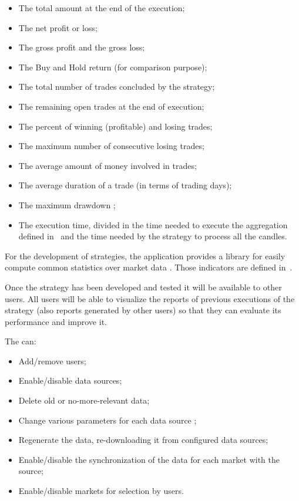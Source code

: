 \begin{itemize}
	\item The total amount at the end of the execution;
	\item The net profit or loss;
	\item The gross profit  and the gross loss;
	\item The Buy and Hold return (for comparison purpose);
	\item The total number of trades concluded by the strategy;
	\item The remaining open trades at the end of execution;
	\item The percent of winning (profitable) and losing trades;
	\item The maximum number of consecutive losing trades;
	\item The average amount of money involved in trades;
	\item The average duration of a trade (in terms of trading days);
	\item The maximum drawdown ;
	\item The execution time, divided in the time needed to execute the
		aggregation defined in~
		and the time needed by the strategy to process all the candles.
\end{itemize}

For the development of strategies, the application provides a library for easily
compute common statistics over market data . Those indicators are
defined in~.

Once the strategy has been developed and tested it will be available to other
users. All users will be able to visualize the reports of previous executions of
the strategy (also reports generated by other users) so that they can evaluate
its performance and improve it.

The  can:
\begin{itemize}
	\item Add/remove users;
	\item Enable/disable data sources;
	\item Delete old or no-more-relevant data;
	\item Change various parameters for each data source ;
	\item Regenerate the data, re-downloading it from configured data
		sources;
	\item Enable/disable the synchronization of the data for each market
		with the source;
	\item Enable/disable markets for selection by users.
\end{itemize}

